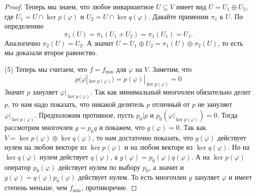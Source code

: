 \begin{proof}
Теперь мы знаем, что любое инвариантное $U\subseteq V$ имеет вид $U = U_1 \oplus U_2$, где $U_1 = U\cap \ker p(\varphi)$ и $U_2 = U\cap \ker q(\varphi)$.
Давайте применим $\pi_1$ к $U$.
По определению 
\[
\pi_1(U) = \pi_1(U_1 + U_2) = \pi_1(U_1) = U_1.
\]
Аналогично $\pi_2 (U) = U_2$.
А значит $U = U_1\oplus U_2 = \pi_1(U) \oplus \pi_2(U)$, то есть мы доказали второе равенство.


(5) Теперь мы считаем, что $f = f_\text{min}$ для $\varphi$ на $V$.
Заметим, что
\[
p(\varphi|_{\ker p(\varphi)}) = p(\varphi)|_{\ker p(\varphi)} = 0
\]
Значит $p$ зануляет $\varphi|_{\ker p(\varphi)}$.
Так как минимальный многочлен обязательно делит $p$, то нам надо показать, что никакой делитель $p$ отличный от $p$ не зануляет $\varphi|_{\ker p(\varphi)}$.
Предположим противное, пусть $p_0 | p$ и $p_0(\varphi|_{\ker p(\varphi)}) = 0$.
Тогда рассмотрим многочлен $g = p_0 q$ и покажем, что $g(\varphi) = 0$.
Так как $V = \ker p(\varphi) \oplus \ker q(\varphi)$, то нам достаточно показать, что  $g(\varphi)$ действует нулем на любом векторе из $\ker p(\varphi)$ и на любом векторе из $\ker q(\varphi)$.
Но на $\ker q(\varphi)$ нулем действует $q(\varphi)$, а $g(\varphi) = p_0(\varphi)q(\varphi)$.
А на $\ker p(\varphi)$ оператор $p_0(\varphi)$ действует нулем по выбору $p_0$, а значит и $g(\varphi) = q(\varphi) p_0(\varphi)$ действует нулем.
То есть многочлен $g$ зануляет $\varphi$ и имеет степень меньше, чем $f_\text{min}$, противоречие.

\end{proof}

